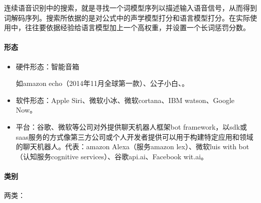 \documentclass[letterpaper,10pt,english]{sphinxmanual}
\begin{document}
连续语音识别中的搜索，就是寻找一个词模型序列以描述输入语音信号，从而得到词解码序列。搜索所依据的是对公式中的声学模型打分和语言模型打分。在实际使用中，往往要依据经验给语言模型加上一个高权重，并设置一个长词惩罚分数。


\paragraph{形态}
\label{\detokenize{chapter_AI_dive/chatbot:id8}}\begin{itemize}
\item {} 
硬件形态：智能音箱%
\begin{footnote}[965]\sphinxAtStartFootnote
{}
%
\end{footnote}如amazon
echo（2014年11月全球第一款）、公子小白、。

\item {} 
软件形态：Apple Siri、微软小冰、微软cortana、IBM watson、Google Now。

\item {} 
平台：谷歌、微软等公司对外提供聊天机器人框架bot
framework，以sdk或saas服务的方式像第三方公司或个人开发者提供可以用于构建特定应用和领域的聊天机器人。代表：amazon
Alexa（服务amazon lex）、微软luis with bot（认知服务cognitive
services）、谷歌api.ai、Facebook wit.ai。

\end{itemize}


\paragraph{类别}
\label{\detokenize{chapter_AI_dive/chatbot:id9}}
两类：
\end{document}
